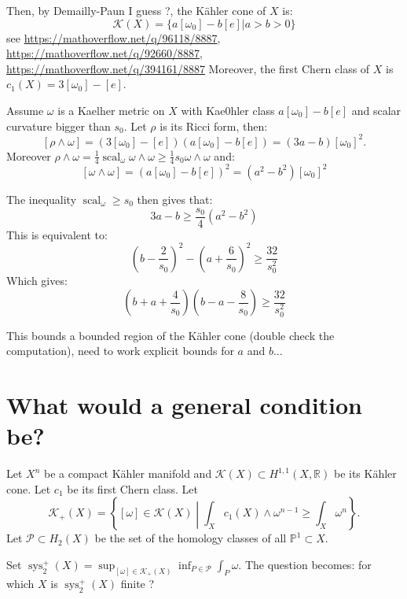 \documentclass{amsart}
\numberwithin{equation}{section}
\theoremstyle{definition}
\DeclareMathOperator{\scal}{scal}
\DeclareMathOperator{\sys}{sys}
\begin{document}
Then, by Demailly-Paun I guess ?, the K\"ahler cone of $X$ is:
\[\mathcal{K}(X)=\{a[\omega_0]-b[e]|a>b>0\}\]
see \url{https://mathoverflow.net/q/96118/8887}, \url{https://mathoverflow.net/q/92660/8887}, \url{https://mathoverflow.net/q/394161/8887}
Moreover, the first Chern class of $X$ is $c_1(X)=3[\omega_0]-[e]$.

Assume $\omega$ is a Kaelher metric on $X$ with Kae0hler class $a[\omega_0]-b[e]$ and scalar curvature bigger than $s_0$. Let $\rho$ is its Ricci form, then:
\[[\rho\wedge\omega]=(3[\omega_0]-[e])(a[\omega_0]-b[e])=(3a-b)[\omega_0]^2.\]
Moreover $\rho\wedge\omega=\tfrac{1}{4}\scal_\omega \omega\wedge\omega\geq\tfrac{1}{4} s_0\omega\wedge\omega$ and:
\[[\omega\wedge\omega]=(a[\omega_0]-b[e])^2=(a^2-b^2)[\omega_0]^2\]

The inequality $\scal_\omega\geq s_0$ then gives that:
\[3a-b\geq \frac{s_0}{4}(a^2-b^2)\]
This is equivalent to:
\[\left(b-\frac{2}{s_0}\right)^2-\left(a+\frac{6}{s_0}\right)^2\geq \frac{32}{s_0^2}\]
Which gives:
\[\left(b+a+\frac{4}{s_0}\right)\left(b-a-\frac{8}{s_0}\right)\geq\frac{32}{s_0^2} \]

This bounds a bounded region of the K\"ahler cone (double check the computation), need to work explicit bounds for $a$ and $b$...

\section{What would a general condition be?}

Let $X^n$ be a compact K\"ahler manifold and $\mathcal{K}(X)\subset H^{1,1}(X,\mathbb{R})$ be its K\"ahler cone. Let $c_1$ be its first Chern class. Let \[\mathcal{K}_+(X)=\left\{[\omega]\in\mathcal{K}(X)\middle|\int_X c_1(X)\wedge \omega^{n-1}\geq \int_X\omega^n\right\}.\]
Let $\mathcal{P}\subset H_2(X)$ be the set of the homology classes of  all $\mathbb{P}^1 \subset X$.

Set $\sys_2^+(X)=\sup_{[\omega]\in \mathcal{K}_+(X)}\inf_{P\in\mathcal{P}}\int_P\omega$. The question becomes: for which $X$ is $\sys_2^+(X)$ finite ?
\end{document}
